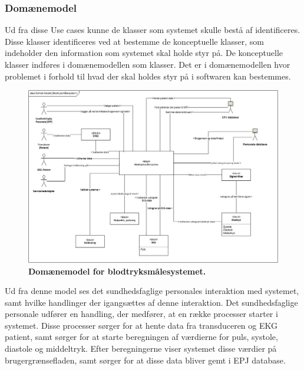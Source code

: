 \subsubsection{Domænemodel} 
Ud fra disse Use cases kunne de klasser som systemet skulle bestå af identificeres. Disse klasser identificeres ved at bestemme de konceptuelle klasser, som indeholder den information som systemet skal holde styr på. De konceptuelle klasser indføres i domænemodellen som klasser. Det er i domænemodellen hvor problemet i forhold til hvad der skal holdes styr på i softwaren kan bestemmes. 
\begin{figure}[H]
\includegraphics[width =1.0\textwidth , center]{billeder/DM}
\caption{\textbf{Domænemodel for blodtryksmålesystemet.}}
\end{figure}
Ud fra denne model ses det sundhedsfaglige personales interaktion med systemet, samt hvilke handlinger der igangsættes af denne interaktion. Det sundhedsfaglige personale udfører en handling, der medfører, at en række processer starter i systemet. Disse processer sørger for at hente data fra transduceren og EKG patient, samt sørger for at starte beregningen af værdierne for puls,
systole, diastole og middeltryk. Efter beregningerne viser systemet disse værdier på brugergrænsefladen, samt sørger for at disse data bliver gemt i EPJ database. 

